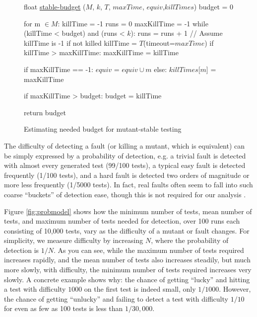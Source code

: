 \documentclass{svjour3}
\begin{document}
\begin{figure}
{%
\begin{code}
float {\underline{stable-budget}} ($M$, $k$, $T$, $maxTime$, $equiv$,$killTimes$)
\vspace{0.1in}
  budget = 0

  for m $\in M$:
     killTime = -1
     runs = 0
     maxKillTime = -1
     while (killTime < budget) and (runs < $k$):
         runs = runs + 1
         // Assume killTime is -1 if not killed
         killTime = $T$(timeout=$maxTime$)
         if killTime > maxKillTime:
            maxKillTime = killTime

     if maxKillTime == -1:
        $equiv$ = $equiv \cup m$
     else:
        $killTimes$[$m$] = maxKillTime

     if maxKillTime > budget:
        budget = killTime
  
  return budget
\end{code}
}
\caption{Estimating needed budget for mutant-stable testing}
\label{alg:testdepth}
\end{figure}

The difficulty of detecting a fault (or killing a mutant, which is
equivalent) can be simply expressed by a probability of detection,
e.g. a trivial fault is detected with almost every generated test
(99/100 tests), a typical easy fault is detected frequently (1/100
tests), and a hard fault is detected two orders of magnitude or more
less frequently (1/5000 tests).  In fact, real faults often seem to
fall into such coarse ``buckets'' of detection ease, though this is not
required for our analysis \cite{PLDI13}.  

Figure \ref{fig:probmodel} shows how the minimum number of tests, mean
number of tests, and maximum number of tests needed for detection,
over 100 runs each consisting of 10,000 tests, vary as the difficulty
of a mutant or fault changes.  For simplicity, we measure difficulty
by increasing $N$, where the probability of detection is $1/N$.  As
you can see, while the maximum number of tests required increases
rapidly, and the mean number of tests also increases steadily, but
much more slowly, with
difficulty, the minimum number of tests required increases very
slowly.  A concrete example shows why: the chance of getting ``lucky'' and hitting a test with
difficulty $1000$ on the first test is indeed small, only $1/1000$.  However, the
chance of getting ``unlucky'' and failing to detect a test with
difficulty $1/10$ for even as few as 100 tests is less than $1/30,000$.
\end{document}
